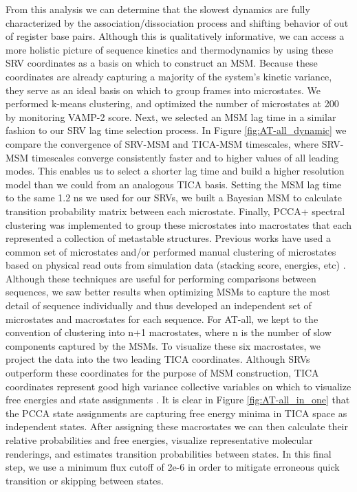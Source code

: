 \documentclass[journal=jpcbfk,manuscript=article]{achemso}
\begin{document}
From this analysis we can determine that the slowest dynamics are fully characterized by the association/dissociation process and shifting behavior of out of register base pairs. Although this is qualitatively informative, we can access a more holistic picture of sequence kinetics and thermodynamics by using these SRV coordinates as a basis on which to construct an MSM. Because these coordinates are already capturing a majority of the system's kinetic variance, they serve as an ideal basis on which to group frames into microstates. We performed k-means clustering, and optimized the number of microstates at 200 by monitoring VAMP-2 score. Next, we selected an MSM lag time in a similar fashion to our SRV lag time selection process. In Figure \ref{fig:AT-all_dynamic} we compare the convergence of SRV-MSM and TICA-MSM timescales, where SRV-MSM timescales converge consistently faster and to higher values of all leading modes. This enables us to select a shorter lag time and build a higher resolution model than we could from an analogous TICA basis. Setting the MSM lag time to the same 1.2 ns we used for our SRVs, we built a Bayesian MSM to calculate transition probability matrix between each microstate. Finally, PCCA+ spectral clustering was implemented to group these microstates into macrostates that each represented a collection of metastable structures. Previous works have used a common set of microstates and/or performed manual clustering of microstates based on physical read outs from simulation data (stacking score, energies, etc) \citep{Pinamonti2017PredictingModels, PinamontiTheModels}. Although these techniques are useful for performing comparisons between sequences, we saw better results when optimizing MSMs to capture the most detail of sequence individually and thus developed an independent set of microstates and macrostates for each sequence. For AT-all, we kept to the convention of clustering into n+1 macrostates, where n is the number of slow components captured by the MSMs. To visualize these six macrostates, we project the data into the two leading TICA coordinates. Although SRVs outperform these coordinates for the purpose of MSM construction, TICA coordinates represent good high variance collective variables on which to visualize free energies and state assignments \citep{Sidky}. It is clear in Figure \ref{fig:AT-all_in_one} that the PCCA state assignments are capturing free energy minima in TICA space as independent states. After assigning these macrostates we can then calculate their relative probabilities and free energies, visualize representative molecular renderings, and estimates transition probabilities between states. In this final step, we use a minimum flux cutoff of 2e-6 in order to mitigate erroneous quick transition or skipping between states. 
\end{document}
